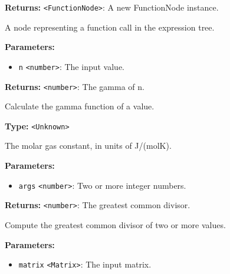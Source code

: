 \documentclass[12pt,a4paper]{article}
\begin{document}
\noindent \textbf{Returns:} \texttt{<FunctionNode>}: A new FunctionNode instance.

\noindent A node representing a function call in the expression tree.

\vspace{5mm}
\noindent {}


\noindent \textbf{Parameters:}
\begin{itemize}
  \item \texttt{n} \texttt{<number>}: The input value.
\end{itemize}

\noindent \textbf{Returns:} \texttt{<number>}: The gamma of n.

\noindent Calculate the gamma function of a value.

\vspace{5mm}
\noindent {}\vspace{4mm}


\noindent \textbf{Type:} \texttt{<Unknown>}

\noindent The molar gas constant, in units of J/(molK).

\vspace{5mm}
\noindent {}


\noindent \textbf{Parameters:}
\begin{itemize}
  \item \texttt{args} \texttt{<number>}: Two or more integer numbers.
\end{itemize}

\noindent \textbf{Returns:} \texttt{<number>}: The greatest common divisor.

\noindent Compute the greatest common divisor of two or more values.

\vspace{5mm}
\noindent {}


\noindent \textbf{Parameters:}
\begin{itemize}
  \item \texttt{matrix} \texttt{<Matrix>}: The input matrix.
\end{itemize}
\end{document}
